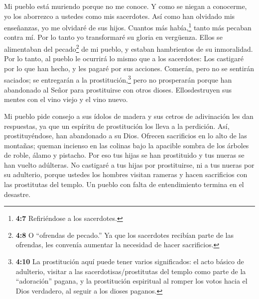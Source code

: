  Mi pueblo está muriendo porque no me conoce. Y como se
niegan a conocerme, yo los aborrezco a ustedes como mis sacerdotes. Así
como han olvidado mis enseñanzas, yo me olvidaré de sus hijos.
 Cuantos más había,\footnote{\textbf{4:7} Refiriéndose a los
  sacerdotes.} tanto más pecaban contra mí. Por lo tanto yo transformaré
su gloria en vergüenza.  Ellos se alimentaban del
pecado\footnote{\textbf{4:8} O ``ofrendas de pecado.'' Ya que los
  sacerdotes recibían parte de las ofrendas, les convenía aumentar la
  necesidad de hacer sacrificios.} de mi pueblo, y estaban hambrientos
de su inmoralidad.  Por lo tanto, al pueblo le ocurrirá lo
mismo que a los sacerdotes: Los castigaré por lo que han hecho, y les
pagaré por sus acciones.  Comerán, pero no se sentirán
saciados; se entregarán a la prostitución,\footnote{\textbf{4:10} La
  prostitución aquí puede tener varios significados: el acto básico de
  adulterio, visitar a las sacerdotisas/prostitutas del templo como
  parte de la ``adoración'' pagana, y la prostitución espiritual al
  romper los votos hacia el Dios verdadero, al seguir a los dioses
  paganos.} pero no prosperarán porque han abandonado al Señor para
prostituirse con otros dioses.  Ellosdestruyen sus mentes
con el vino viejo y el vino nuevo.

 Mi pueblo pide consejo a sus ídolos de madera y sus cetros
de adivinación les dan respuestas, ya que un espíritu de prostitución
los lleva a la perdición. Así, prostituyéndose, han abandonado a su
Dios.  Ofrecen sacrificios en lo alto de las montañas;
queman incienso en las colinas bajo la apacible sombra de los árboles de
roble, álamo y pistacho. Por eso tus hijas se han prostituido y tus
nueras se han vuelto adúlteras.  No castigaré a tus hijas
por prostituirse, ni a tus nueras por su adulterio, porque ustedes los
hombres visitan rameras y hacen sacrificios con las prostitutas del
templo. Un pueblo con falta de entendimiento termina en el desastre.

